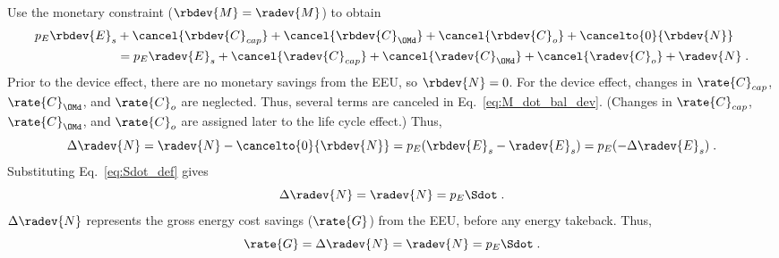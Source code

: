 \begin{landscape}
{    Use the monetary constraint ($\rbdev{M} = \radev{M}$) to obtain
  \begin{align} \label{eq:M_dot_bal_dev}
  p_E \rbdev{E}_s &+ \cancel{\rbdev{C}_{cap}} + \cancel{\rbdev{C}_{\OMd}} + \cancel{\rbdev{C}_o} + \cancelto{0}{\rbdev{N}} \nonumber \\
  &= p_E \radev{E}_s + \cancel{\radev{C}_{cap}} + \cancel{\radev{C}_{\OMd}} + \cancel{\radev{C}_o}  + \radev{N} \; .
  \end{align}
  Prior to the device effect, there are no monetary savings from the EEU, so $\rbdev{N} = 0$.
  For the device effect, 
  changes in $\rate{C}_{cap}$, $\rate{C}_{\OMd}$, and $\rate{C}_o$ are neglected.
  Thus, several terms are canceled in Eq.~\ref{eq:M_dot_bal_dev}.
  (Changes in $\rate{C}_{cap}$, $\rate{C}_{\OMd}$, and $\rate{C}_o$ 
      are assigned later to the life cycle effect.)
  Thus, 
  \begin{equation}
  \Delta \radev{N} = \radev{N} - \cancelto{0}{\rbdev{N}} = p_E(\rbdev{E}_s - \radev{E}_s) = p_E (-\Delta \radev{E}_s) \; .
  \end{equation}
  Substituting Eq.~\ref{eq:Sdot_def} gives
  \begin{equation}
  \Delta \radev{N} = \radev{N} = p_E \Sdot \; .
  \end{equation}
  $\Delta \radev{N}$ represents the gross energy cost savings ($\rate{G}$) from the EEU, 
  before any energy takeback. 
  Thus, 
  \begin{equation} \label{eq:G_dot}
  \rate{G} = \Delta \radev{N} = \radev{N} = p_E \Sdot \; .
  \end{equation}
}

\end{landscape}